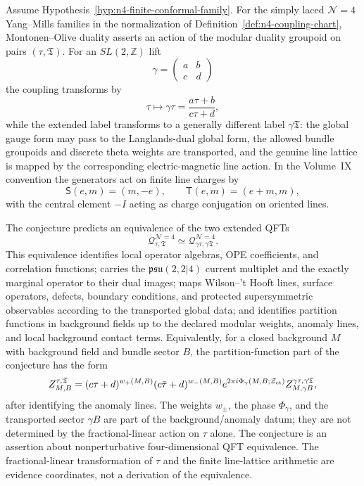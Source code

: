 \begin{conjecture}
\label{conj:n4-montonen-olive-s-duality}
Assume Hypothesis~\ref{hyp:n4-finite-conformal-family}.  For the simply
laced \(\mathcal N=4\) Yang--Mills families in the normalization of
Definition~\ref{def:n4-coupling-chart}, Montonen--Olive duality asserts an
action of the modular duality groupoid on pairs \((\tau,\mathfrak T)\).  For
an \(SL(2,\mathbb Z)\) lift
\[
  \gamma=\begin{pmatrix}a&b\\ c&d\end{pmatrix}
\]
the coupling transforms by
\[
  \tau\longmapsto\gamma\tau=\frac{a\tau+b}{c\tau+d},
\]
while the extended label transforms to a generally different label
\(\gamma\mathfrak T\): the global gauge form may pass to the Langlands-dual
global form, the allowed bundle groupoids and discrete theta weights are
transported, and the genuine line lattice is mapped by the corresponding
electric-magnetic line action.  In the Volume~IX convention the generators act
on finite line charges by
\[
  \mathsf S(e,m)=(m,-e),
  \qquad
  \mathsf T(e,m)=(e+m,m),
\]
with the central element \(-I\) acting as charge conjugation on oriented
lines.

The conjecture predicts an equivalence of the two extended QFTs
\[
  \mathcal Q_{\tau,\mathfrak T}^{\mathcal N=4}
  \simeq
  \mathcal Q_{\gamma\tau,\gamma\mathfrak T}^{\mathcal N=4}.
\]
This equivalence identifies local operator algebras, OPE coefficients, and
correlation functions; carries the \(\mathfrak{psu}(2,2|4)\) current
multiplet and the exactly marginal operator to their dual images; maps
Wilson--'t Hooft lines, surface operators, defects, boundary conditions, and
protected supersymmetric observables according to the transported global
data; and identifies partition functions in background fields up to the
declared modular weights, anomaly lines, and local background contact terms.
Equivalently, for a closed background \(M\) with background field and bundle
sector \(B\), the partition-function part of the conjecture has the form
\[
  Z_{M,B}^{\tau,\mathfrak T}
  =
  (c\tau+d)^{w_+(M,B)}(c\bar\tau+d)^{w_-(M,B)}
  e^{2\pi i\Phi_\gamma(M,B;\mathcal Z_{\rm ct})}
  Z_{M,\gamma B}^{\gamma\tau,\gamma\mathfrak T},
\]
after identifying the anomaly lines.  The weights \(w_\pm\), the phase
\(\Phi_\gamma\), and the transported sector \(\gamma B\) are part of the
background/anomaly datum; they are not determined by the fractional-linear
action on \(\tau\) alone.
The conjecture is an assertion about nonperturbative four-dimensional QFT
equivalence.  The fractional-linear transformation of \(\tau\) and the
finite line-lattice arithmetic are evidence coordinates, not a derivation of
the equivalence.
\end{conjecture}

